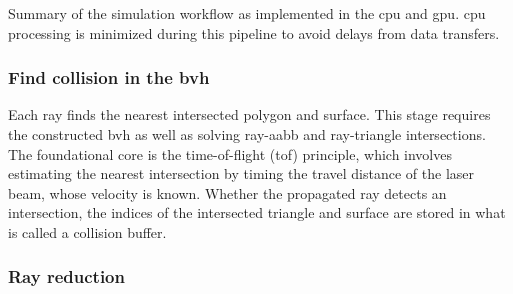 \begin{marginfigure}[-4.0cm]
	\caption{Summary of the simulation workflow as implemented in the \acrshort{cpu} and \acrshort{gpu}. \acrshort{cpu} processing is minimized during this pipeline to avoid delays from data transfers.}
	\label{fig:lidar_workflow}
\end{marginfigure}

\subsubsection{Find collision in the \acrshort{bvh}}

Each ray finds the nearest intersected polygon and surface. This stage requires the constructed \acrshort{bvh} as well as solving ray-\acrshort{aabb} and ray-triangle intersections. The foundational core is the time-of-flight (\acrshort{tof}) principle, which involves estimating the nearest intersection by timing the travel distance of the laser beam, whose velocity is known. Whether the propagated ray detects an intersection, the indices of the intersected triangle and surface are stored in what is called a collision buffer. 

\subsubsection{Ray reduction}

